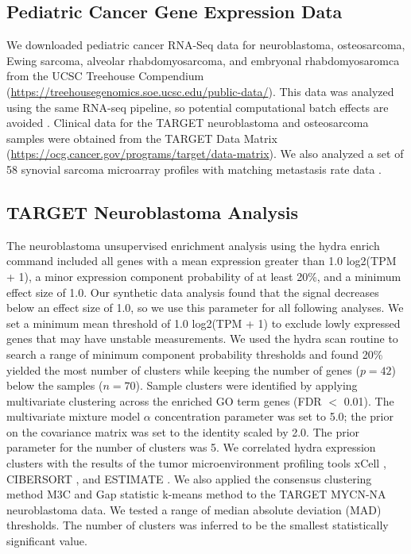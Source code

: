 \documentclass[10pt,letterpaper]{article}
\begin{document}

\subsection{Pediatric Cancer Gene Expression Data}
We downloaded pediatric cancer RNA-Seq data for neuroblastoma, osteosarcoma, Ewing sarcoma, alveolar rhabdomyosarcoma, and embryonal rhabdomyosaromca from the UCSC Treehouse Compendium (\url{https://treehousegenomics.soe.ucsc.edu/public-data/}). This data was analyzed using the same RNA-seq pipeline, so potential computational batch effects are avoided \cite{vivianToilEnablesReproducible2017}. Clinical data for the TARGET neuroblastoma and osteosarcoma samples were obtained from the TARGET Data Matrix (\url{https://ocg.cancer.gov/programs/target/data-matrix}). We also analyzed a set of 58 synovial sarcoma microarray profiles with matching metastasis rate data \cite{lagardeChromosomeInstabilityAccounts2013}.
 
\subsection{TARGET Neuroblastoma Analysis}
The neuroblastoma unsupervised enrichment analysis using the hydra enrich command included all genes with a mean expression greater than 1.0 log2(TPM + 1), a minor expression component probability of at least 20\%, and a minimum effect size of 1.0. Our synthetic data analysis found that the signal decreases below an effect size of 1.0, so we use this parameter for all following analyses. We set a minimum mean threshold of 1.0 log2(TPM + 1) to exclude lowly expressed genes that may have unstable measurements. We used the hydra scan routine to search a range of minimum component probability thresholds and found 20\% yielded the most number of clusters while keeping the number of genes ($p=42$) below the samples ($n=70$). Sample clusters were identified by applying multivariate clustering across the enriched GO term genes (FDR $<$ 0.01). The multivariate mixture model $\alpha$ concentration parameter was set to 5.0; the prior on the covariance matrix was set to the identity scaled by 2.0. The prior parameter for the number of clusters was 5. We correlated hydra expression clusters with the results of the tumor microenvironment profiling tools xCell \cite{aranXCellDigitallyPortraying2017}, CIBERSORT \cite{newmanRobustEnumerationCell2015}, and ESTIMATE \cite{yoshiharaInferringTumourPurity2013}. We also applied the consensus clustering method M3C \cite{johnM3CMonteCarlo2018} and Gap statistic k-means method \cite{tibshirani2001estimating} to the TARGET MYCN-NA neuroblastoma data. We tested a range of median absolute deviation (MAD) thresholds. The number of clusters was inferred to be the smallest statistically significant value.
\end{document}

